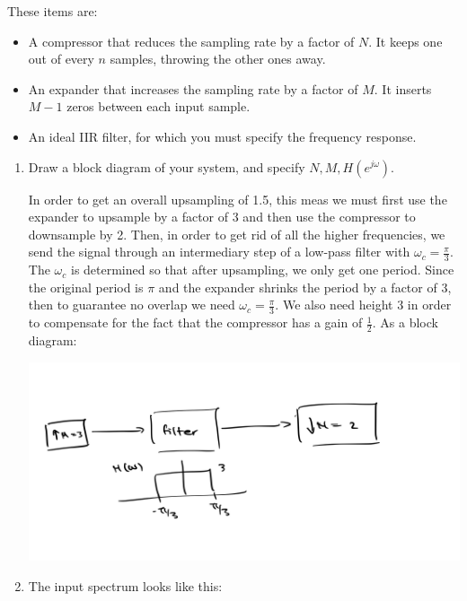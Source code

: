 \documentclass[10pt]{article}
\begin{document}
	These items are:
	\begin{itemize}
		\item A compressor that reduces the sampling rate by a factor of \( N \). It keeps one out of every \( n \) 
			samples, throwing the other ones away. 
		\item An expander that increases the sampling rate by a factor of \( M \). It inserts \( M - 1 \) 
			zeros between each input sample. 
		\item An ideal IIR filter, for which you must specify the frequency response. 
	\end{itemize}

	\begin{enumerate}[label=\alph*)]
		\item Draw a block diagram of your system, and specify \( N, M, H(e^{j \omega}) \). 

			\begin{solution}
				In order to get an overall upsampling of 1.5, this meas we must first use the expander to 
				upsample by a factor of 3 and then use the compressor to downsample by 2. Then, in order to 
				get rid of all the higher frequencies, we send the signal through an intermediary step of a
				low-pass filter with \( \omega_c = \frac{\pi}{3} \). The \( \omega_c \) is determined so that 
				after upsampling, we only get one period. Since the original period is \( \pi \) and the expander 
				shrinks the period by a factor of 3, then to guarantee no overlap we need 
				\( \omega_c = \frac{\pi}{3} \). We also need height \( 3 \) in order to compensate 
				for the fact that the compressor has a gain of \( \frac{1}{2} \). As a block diagram:
				\begin{center}
					\includegraphics[scale=0.2]{q4a.jpeg}
				\end{center}
			\end{solution}
		\item The input spectrum looks like this:


\end{enumerate}
\end{document}
